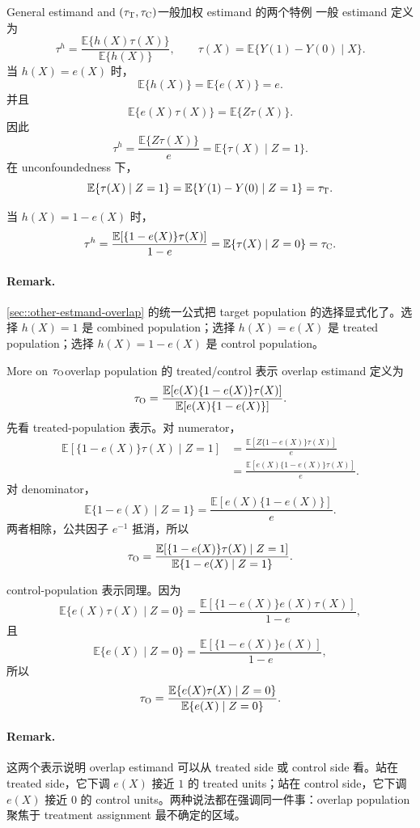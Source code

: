 \begin{exercisesolution}{General estimand and $(\tau_\textsc{T}, \tau_\textsc{C})$}{一般加权 estimand 的两个特例}
一般 estimand 定义为
\[
\tau^h=\frac{\mathbb{E}\{h(X)\tau(X)\}}{\mathbb{E}\{h(X)\}},
\qquad
\tau(X)=\mathbb{E}\{Y(1)-Y(0)\mid X\}.
\]
当 $h(X)=e(X)$ 时，
\[
\mathbb{E}\{h(X)\}=\mathbb{E}\{e(X)\}=e.
\]
并且
\[
\mathbb{E}\{e(X)\tau(X)\}
=\mathbb{E}\{Z\tau(X)\}.
\]
因此
\[
\tau^h
=\frac{\mathbb{E}\{Z\tau(X)\}}{e}
=\mathbb{E}\{\tau(X)\mid Z=1\}.
\]
在 unconfoundedness 下，
\[
\mathbb{E}\{\tau(X)\mid Z=1\}
=\mathbb{E}\{Y(1)-Y(0)\mid Z=1\}
=\tau_\textsc{T}.
\]

当 $h(X)=1-e(X)$ 时，
\[
\tau^h
=\frac{\mathbb{E}[\{1-e(X)\}\tau(X)]}{1-e}
=\mathbb{E}\{\tau(X)\mid Z=0\}
=\tau_\textsc{C}.
\]

\paragraph{Remark.}
\cref{sec::other-estmand-overlap} 的统一公式把 target population 的选择显式化了。选择 $h(X)=1$ 是 combined population；选择 $h(X)=e(X)$ 是 treated population；选择 $h(X)=1-e(X)$ 是 control population。
\end{exercisesolution}

\begin{exercisesolution}{More on $\tau_\textsc{O}$}{overlap population 的 treated/control 表示}
overlap estimand 定义为
\[
\tau_\textsc{O}
=\frac{\mathbb{E}[e(X)\{1-e(X)\}\tau(X)]}
       {\mathbb{E}[e(X)\{1-e(X)\}]}.
\]
先看 treated-population 表示。对 numerator，
\begin{align*}
\mathbb{E}[\{1-e(X)\}\tau(X)\mid Z=1]
&=\frac{\mathbb{E}[Z\{1-e(X)\}\tau(X)]}{e}\\
&=\frac{\mathbb{E}[e(X)\{1-e(X)\}\tau(X)]}{e}.
\end{align*}
对 denominator，
\[
\mathbb{E}\{1-e(X)\mid Z=1\}
=\frac{\mathbb{E}[e(X)\{1-e(X)\}]}{e}.
\]
两者相除，公共因子 $e^{-1}$ 抵消，所以
\[
\tau_\textsc{O}
=\frac{\mathbb{E}[\{1-e(X)\}\tau(X)\mid Z=1]}
       {\mathbb{E}\{1-e(X)\mid Z=1\}}.
\]

control-population 表示同理。因为
\[
\mathbb{E}\{e(X)\tau(X)\mid Z=0\}
=\frac{\mathbb{E}[\{1-e(X)\}e(X)\tau(X)]}{1-e},
\]
且
\[
\mathbb{E}\{e(X)\mid Z=0\}
=\frac{\mathbb{E}[\{1-e(X)\}e(X)]}{1-e},
\]
所以
\[
\tau_\textsc{O}
=\frac{\mathbb{E}\{e(X)\tau(X)\mid Z=0\}}
       {\mathbb{E}\{e(X)\mid Z=0\}}.
\]

\paragraph{Remark.}
这两个表示说明 overlap estimand 可以从 treated side 或 control side 看。站在 treated side，它下调 $e(X)$ 接近 $1$ 的 treated units；站在 control side，它下调 $e(X)$ 接近 $0$ 的 control units。两种说法都在强调同一件事：overlap population 聚焦于 treatment assignment 最不确定的区域。
\end{exercisesolution}

